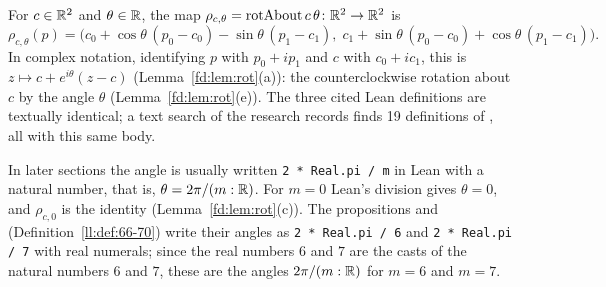 \begin{definition}\label{fd:def:rot}\sloppy
For $c\in\mathbb R^2$ and $\theta\in\mathbb R$, the map $\rho_{c,\theta}=\mathrm{rotAbout}\,c\,\theta\colon\mathbb R^2\to\mathbb R^2$
is
\[
  \rho_{c,\theta}(p)=\bigl(c_0+\cos\theta\,(p_0-c_0)-\sin\theta\,(p_1-c_1),\;
  c_1+\sin\theta\,(p_0-c_0)+\cos\theta\,(p_1-c_1)\bigr).
\]
In complex notation, identifying $p$ with $p_0+ip_1$ and $c$ with $c_0+ic_1$, this is
$z\mapsto c+e^{i\theta}(z-c)$ (Lemma~\ref{fd:lem:rot}(a)): the counterclockwise rotation about $c$ by
the angle $\theta$ (Lemma~\ref{fd:lem:rot}(e)). The three cited Lean definitions are textually
identical; a text search of the research records finds 19 definitions of , all with this
same body.
\end{definition}

\begin{remark}[Angles $2\pi/m$]\label{fd:rem:angles}
In later sections the angle is usually written \texttt{2 * Real.pi / m} in Lean with  a natural
number, that is, $\theta=2\pi/(m:\mathbb R)$. For $m=0$ Lean's division gives $\theta=0$, and $\rho_{c,0}$ is
the identity (Lemma~\ref{fd:lem:rot}(c)). The propositions  and 
(Definition~\ref{ll:def:66-70}) write their angles as \texttt{2 * Real.pi / 6} and
\texttt{2 * Real.pi / 7} with real numerals; since the real numbers $6$ and $7$ are the casts of the
natural numbers $6$ and $7$, these are the angles $2\pi/(m:\mathbb R)$ for $m=6$ and $m=7$.
\end{remark}

